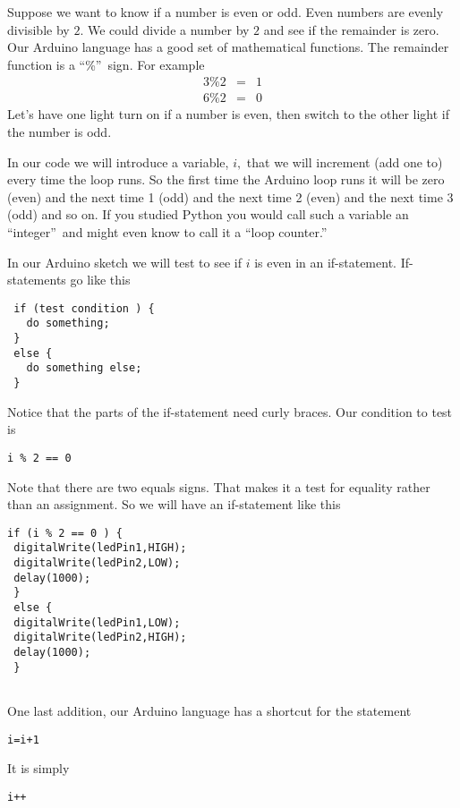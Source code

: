 Suppose we want to know if a number is even or odd. Even numbers are evenly
divisible by $2.$ We could divide a number by $2$ and see if the remainder
is zero. Our Arduino language has a good set of mathematical functions. The
remainder function is a \textquotedblleft \%\textquotedblright\ sign. For
example 
\begin{eqnarray*}
3\%2 &=&1 \\
6\%2 &=&0
\end{eqnarray*}%
Let's have one light turn on if a number is even, then switch to the other
light if the number is odd.

In our code we will introduce a variable, $i,$ that we will increment (add
one to) every time the loop runs. So the first time the Arduino loop runs it
will be zero (even) and the next time 1 (odd) and the next time 2 (even) and
the next time 3 (odd) and so on. If you studied Python you would call such a
variable an \textquotedblleft integer\textquotedblright\ and might even know
to call it a \textquotedblleft loop counter.\textquotedblright

In our Arduino sketch we will test to see if $i$ is even in an if-statement.
If-statements go like this
\begin{verbatim}
 if (test condition ) {
   do something;
 }
 else {
   do something else;
 }
\end{verbatim}

Notice that the parts of the if-statement need curly braces. Our condition
to test is
\begin{verbatim}
i % 2 == 0
\end{verbatim}

Note that there are two equals signs. That makes it a test for equality
rather than an assignment. So we will have an if-statement like this
\begin{verbatim}
if (i % 2 == 0 ) {
 digitalWrite(ledPin1,HIGH);
 digitalWrite(ledPin2,LOW);
 delay(1000);
 }
 else {
 digitalWrite(ledPin1,LOW);
 digitalWrite(ledPin2,HIGH);
 delay(1000);
 }
 
\end{verbatim}

One last addition, our Arduino language has a shortcut for the statement
\begin{verbatim}
i=i+1
\end{verbatim}

It is simply
\begin{verbatim}
i++
\end{verbatim}

